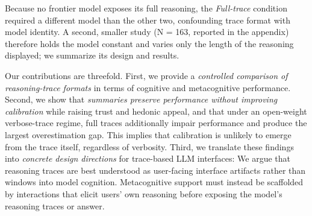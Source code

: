 \documentclass[manuscript,review,anonymous]{acmart}
\begin{document}
Because no frontier model exposes its full reasoning, the \textit{Full-trace} condition required a different model than the other two, confounding trace format with model identity. A second, smaller study (N = 163, reported in the appendix) therefore holds the model constant and varies only the length of the reasoning displayed; we summarize its design and results.

Our contributions are threefold. First, we provide a \textit{controlled comparison of reasoning-trace formats} in terms of cognitive and metacognitive performance. %
Second, we show that \textit{summaries preserve performance without improving calibration} while raising trust and hedonic appeal, and that under an open-weight verbose-trace regime, full traces additionally impair performance and produce the largest overestimation gap. This implies that calibration is unlikely to emerge from the trace itself, regardless of verbosity.
Third, we translate these findings into \textit{concrete design directions} for trace-based LLM interfaces: We argue that reasoning traces are best understood as user-facing interface artifacts rather than windows into model cognition. Metacognitive support must instead be scaffolded by interactions that elicit users' own reasoning before exposing the model's reasoning traces or answer.



\end{document}
